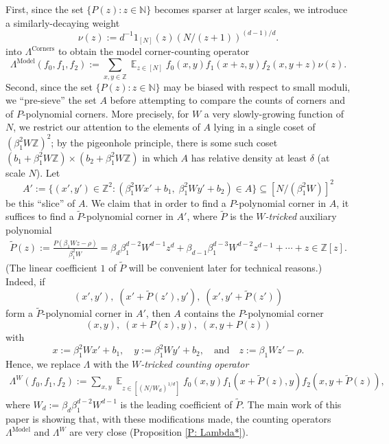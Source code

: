 \documentclass[11pt]{amsart}
\theoremstyle{definition}
\DeclareMathOperator*{\E}{\mathbb{E}}
\newcommand{\N}{{\mathbb N}}
\newcommand{\Z}{{\mathbb Z}}
\newcommand{\model}{{\mathrm{Model}}}
\DeclareMathOperator{\corners}{Corners}
\begin{document}
First, since the set $\{P(z): z \in \N\}$ becomes sparser at larger scales, we introduce a similarly-decaying weight
$$\nu(z):=d^{-1} 1_{[N]}(z) (N/(z+1))^{(d-1)/d}.$$
into $\Lambda^{\corners}$ to obtain the {model corner-counting operator}
$$\Lambda^{\model}(f_0,f_1,f_2):=\sum_{x,y\in \mathbb{Z}}  \E_{z \in [N]} f_0(x,y)f_1(x+z,y)f_2(x,y+z)\nu(z).$$
Second, since the set $\{P(z): z \in \N\}$ may be biased with respect to small moduli, we ``pre-sieve'' the set $A$ before attempting to compare the counts of corners and of $P$-polynomial corners.  More precisely, for $W$ a very slowly-growing function of $N$, we restrict our attention to the elements of $A$ lying in a single coset of $(\beta_1^2 W\Z)^2$; by the pigeonhole principle, there is some such coset $(b_1+\beta_1^2 W\Z) \times (b_2+\beta_1^2 W\Z)$ in which $A$ has relative density at least $\delta$ (at scale $N$).  Let
$$A':=\{(x',y') \in \Z^2: (\beta_1^2 W x'+b_1,\; \beta_1^2 W y'+b_2) \in A\} \subseteq [N/(\beta_1^2 W)]^2$$
be this ``slice'' of $A$.  We claim that in order to find a $P$-polynomial corner in $A$, it suffices to find a $\widetilde P$-polynomial corner in $A'$, where $\widetilde P$ is the \emph{$W$-tricked} auxiliary polynomial
\begin{align}\label{E: tilde P}
    \widetilde P(z):=\frac{P(\beta_1 Wz - \rho)}{\beta_1^2 W}=\beta_d \beta_1^{d-2}W^{d-1}z^d+\beta_{d-1} \beta_1^{d-3} W^{d-2}z^{d-1}+\cdots+z \in \mathbb{Z}[z].
\end{align}
(The linear coefficient $1$ of $\widetilde P$ will be convenient later for technical reasons.)  Indeed, if $$(x',y'),\; (x'+\widetilde P(z'),y'),\;(x',y'+\widetilde P(z'))$$ form a $\widetilde P$-polynomial corner in $A'$, then $A$ contains the $P$-polynomial corner $$(x,y),\; (x+P(z),y),\; (x,y+P(z))$$ with
$$x:=\beta_1^2 Wx'+b_1, \quad y:=\beta_1^2 Wy'+b_2, \quad \text{and} \quad z:=\beta_1 Wz'-\rho.$$
Hence, we replace $\Lambda$ with the \emph{$W$-tricked counting operator}
\begin{align*}
    \Lambda^W(f_0,f_1,f_2):=\sum_{x,y} \E_{z \in [(N/W_d)^{1/d}]} f_0(x,y)f_1(x+\widetilde{P}(z),y)f_2(x,y+\widetilde{P}(z)),
\end{align*}
where $W_d := \beta_d \beta_1^{d-2}W^{d-1}$ is the leading coefficient of $\widetilde P$.  The main work of this paper is showing that, with these modifications made, the counting operators $\Lambda^{\model}$ and $\Lambda^W$ are very close (Proposition \ref{P: Lambda*}).
\end{document}
